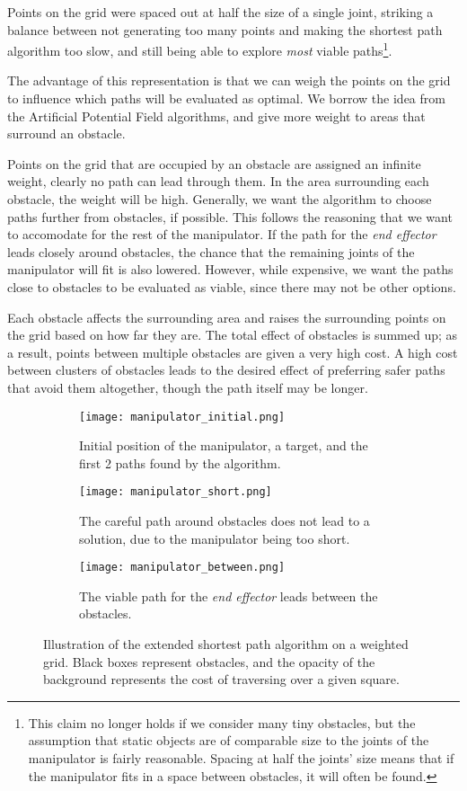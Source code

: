 Points on the grid were spaced out at half the size of a single joint, striking a balance between not generating too many points and making the shortest path algorithm too slow, and still being able to explore \textit{most} viable paths\footnote{This claim no longer holds if we consider many tiny obstacles, but the assumption that static objects are of comparable size to the joints of the manipulator is fairly reasonable. Spacing at half the joints' size means that if the manipulator fits in a space between obstacles, it will often be found.}.

The advantage of this representation is that we can weigh the points on the grid to influence which paths will be evaluated as optimal. We borrow the idea from the Artificial Potential Field algorithms, and give more weight to areas that surround an obstacle.

Points on the grid that are occupied by an obstacle are assigned an infinite weight, clearly no path can lead through them. In the area surrounding each obstacle, the weight will be high. Generally, we want the algorithm to choose paths further from obstacles, if possible. This follows the reasoning that we want to accomodate for the rest of the manipulator. If the path for the \textit{end effector} leads closely around obstacles, the chance that the remaining joints of the manipulator will fit is also lowered. However, while expensive, we want the paths close to obstacles to be evaluated as viable, since there may not be other options.

Each obstacle affects the surrounding area and raises the surrounding points on the grid based on how far they are. The total effect of obstacles is summed up; as a result, points between multiple obstacles are given a very high cost. A high cost between clusters of obstacles leads to the desired effect of preferring safer paths that avoid them altogether, though the path itself may be longer.

\begin{figure}
    \centering
    \begin{subfigure}{.3\textwidth}
      \texttt{[image: manipulator\_initial.png]}
      \caption{Initial position of the manipulator, a target, and the first 2 paths found by the algorithm.}
    \end{subfigure}
    \begin{subfigure}{0.3\textwidth}
      \texttt{[image: manipulator\_short.png]}
      \caption{The careful path around obstacles does not lead to a solution, due to the manipulator being too short.}
    \end{subfigure}
    \begin{subfigure}{.3\textwidth}
      \texttt{[image: manipulator\_between.png]}
      \caption{The viable path for the \textit{end effector} leads between the obstacles.}
    \end{subfigure}
    \caption{Illustration of the extended shortest path algorithm on a weighted grid. Black boxes represent obstacles, and the opacity of the background represents the cost of traversing over a given square.}\label{fig:paths}
\end{figure}

